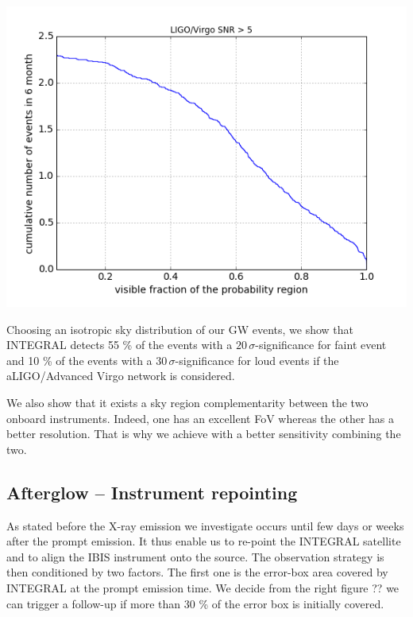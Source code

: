 \documentclass[a0,portrait]{a0poster}
\begin{document}
\begin{multicols}{2}
\begin{center}\vspace{.5cm}
    \includegraphics[width=20cm]{figures/covered_region.png}
    \label{covered_region}
\end{center}

Choosing an isotropic sky distribution of our GW events, we show that INTEGRAL
detects 55 \% of the events with a $20 \, \sigma$-significance for faint event
and 10 \% of the events with a $30 \, \sigma$-significance for loud events if
the aLIGO/Advanced Virgo network is considered.

We also show that it exists a sky region complementarity between the two onboard
instruments. Indeed, one has an excellent FoV whereas the other has a better
resolution. That is why we achieve with a better sensitivity combining the two.

\subsection*{Afterglow -- Instrument repointing}

As stated before the X-ray emission we investigate occurs until few days or
weeks after the prompt emission. It thus enable us to re-point the INTEGRAL
satellite and to align the IBIS instrument onto the source. The observation
strategy is then conditioned by two factors. The first one is the error-box area
covered by INTEGRAL at the prompt emission time. We decide from the right figure
?? we can trigger a follow-up if more than 30 \% of the error box is initially
covered.


\end{multicols}
\end{document}
